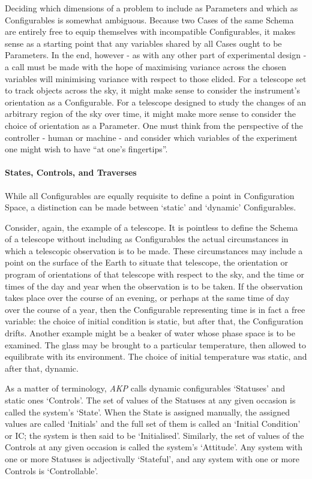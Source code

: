 \documentclass[a4paper,11pt,oneside]{book}
\begin{document}
Deciding which dimensions of a problem to include as Parameters and which as Configurables is somewhat ambiguous. Because two Cases of the same Schema are entirely free to equip themselves with incompatible Configurables, it makes sense as a starting point that any variables shared by all Cases ought to be Parameters. In the end, however - as with any other part of experimental design - a call must be made with the hope of maximising variance across the chosen variables will minimising variance with respect to those elided. For a telescope set to track objects across the sky, it might make sense to consider the instrument's orientation as a Configurable. For a telescope designed to study the changes of an arbitrary region of the sky over time, it might make more sense to consider the choice of orientation as a Parameter. One must think from the perspective of the controller - human or machine - and consider which variables of the experiment one might wish to have ``at one's fingertips''.

\paragraph{States, Controls, and Traverses}

While all Configurables are equally requisite to define a point in Configuration Space, a distinction can be made between `static' and `dynamic' Configurables.

Consider, again, the example of a telescope. It is pointless to define the Schema of a telescope without including as Configurables the actual circumstances in which a telescopic observation is to be made. These circumstances may include a point on the surface of the Earth to situate that telescope, the orientation or program of orientations of that telescope with respect to the sky, and the time or times of the day and year when the observation is to be taken. If the observation takes place over the course of an evening, or perhaps at the same time of day over the course of a year, then the Configurable representing time is in fact a free variable: the choice of initial condition is static, but after that, the Configuration drifts. Another example might be a beaker of water whose phase space is to be examined. The glass may be brought to a particular temperature, then allowed to equilibrate with its environment. The choice of initial temperature was static, and after that, dynamic.

As a matter of terminology, \textit{AKP} calls dynamic configurables `Statuses' and static ones `Controls'. The set of values of the Statuses at any given occasion is called the system's `State'. When the State is assigned manually, the assigned values are called `Initials' and the full set of them is called an `Initial Condition' or IC; the system is then said to be `Initialised'. Similarly, the set of values of the Controls at any given occasion is called the system's `Attitude'. Any system with one or more Statuses is adjectivally `Stateful', and any system with one or more Controls is `Controllable'.
\end{document}

